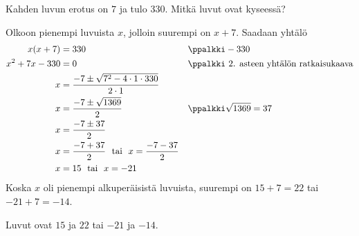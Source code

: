 \begin{esimerkki}
Kahden luvun erotus on $7$ ja tulo 330. Mitkä luvut ovat kyseessä?
\begin{esimratk}
Olkoon pienempi luvuista $x$, jolloin suurempi on $x+7$. Saadaan yhtälö
\begin{align*}
x(x+7) &= 330 && \ppalkki -330 \\
x^2+7x-330 &= 0 && \ppalkki \text{ 2. asteen yhtälön ratkaisukaava}\\
x&=\frac{-7 \pm \sqrt{7^2-4\cdot 1 \cdot 330}}{2\cdot 1} \\
x&=\frac{-7 \pm \sqrt{1369}}{2}  &&	\ppalkki \sqrt{1369} = 37\\
x&=\frac{-7 \pm 37}{2}  \\
x&=\frac{-7 + 37}{2}\  \text{ tai } \  x = \frac{-7 - 37}{2}  \\
x&=15\  \text{ tai } \ x = -21
\end{align*}
Koska $x$ oli pienempi alkuperäisistä luvuista, suurempi on $15+7=22$ tai
$-21+7=-14$.
\end{esimratk}
\begin{esimvast}
Luvut ovat $15$ ja $22$ tai $-21$ ja $-14$.
\end{esimvast}
\end{esimerkki}



